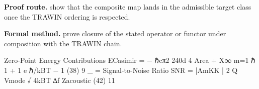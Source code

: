 \textbf{Proof route.} show that the composite map lands in the admissible target class once the TRAWIN ordering is respected.

\textbf{Formal method.} prove closure of the stated operator or functor under composition with the TRAWIN chain.

\medskip
{}

\begin{tzpsnapshot}
\end{tzpsnapshot}

\tzpequationlinks
  {Zero-Point Energy Contributions ECasimir = − ℏcπ2 240d 4 \times Area + X∞ m=1 ℏ   1 + 1 e ℏ\omegam/kBT − 1   (38) 9}
  {_{} = \cdots}
  {Signal-to-Noise Ratio SNR = |AmKK | 2 \cdot Q \cdot Vmode √ 4kBT ∆f \cdot Zacoustic (42) 11}
